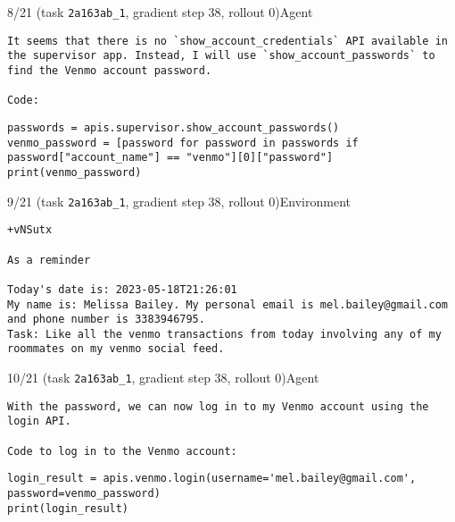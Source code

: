 \begin{minipage}{0.95\linewidth}
\begin{assistant_message_box}{{8/21 (task \texttt{2a163ab\_1}, gradient step 38, rollout 0)\hfill Agent}}
\scriptsize
\begin{Verbatim}[breaklines]
It seems that there is no `show_account_credentials` API available in the supervisor app. Instead, I will use `show_account_passwords` to find the Venmo account password.

Code:
\end{Verbatim}
\begin{tcolorbox}[colback=codebgcolor,boxrule=0pt]\begin{Verbatim}[breaklines]
passwords = apis.supervisor.show_account_passwords()
venmo_password = [password for password in passwords if password["account_name"] == "venmo"][0]["password"]
print(venmo_password)
\end{Verbatim}
\end{tcolorbox}\end{assistant_message_box}
\end{minipage}

\hspace*{8mm}%
\begin{minipage}{0.95\linewidth}
\begin{user_message_box}{{9/21 (task \texttt{2a163ab\_1}, gradient step 38, rollout 0)\hfill Environment}}
\scriptsize
\begin{Verbatim}[breaklines]
+vNSutx

As a reminder

Today's date is: 2023-05-18T21:26:01
My name is: Melissa Bailey. My personal email is mel.bailey@gmail.com and phone number is 3383946795.
Task: Like all the venmo transactions from today involving any of my roommates on my venmo social feed.
\end{Verbatim}
\end{user_message_box}
\end{minipage}

\begin{minipage}{0.95\linewidth}
\begin{assistant_message_box}{{10/21 (task \texttt{2a163ab\_1}, gradient step 38, rollout 0)\hfill Agent}}
\scriptsize
\begin{Verbatim}[breaklines]
With the password, we can now log in to my Venmo account using the login API.

Code to log in to the Venmo account:
\end{Verbatim}
\begin{tcolorbox}[colback=codebgcolor,boxrule=0pt]\begin{Verbatim}[breaklines]
login_result = apis.venmo.login(username='mel.bailey@gmail.com', password=venmo_password)
print(login_result)
\end{Verbatim}
\end{tcolorbox}\end{assistant_message_box}
\end{minipage}

